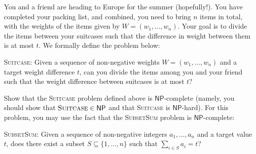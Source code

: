 \documentclass[10pt]{article}
\begin{document}
You and a friend are heading to Europe for the summer (hopefully!).  You have completed your packing list, and combined, you need to bring $n$ items in total, with the weights of the items given by $W = (w_1, \ldots, w_n)$.  Your goal is to divide the items between your suitcases such that the difference in weight between them is at most $t$. We formally define the problem below: 

\begin{framed}
  \noindent
  \textsc{Suitcase}: Given a sequence of non-negative weights $W = (w_1, \ldots, w_n)$ and a target weight difference
  $t$, can you divide the items among you and your friend such that the weight difference between suitcases is at most $t$?
\end{framed}
  
  Show that the \textsc{Suitcase} problem defined above is $\mathsf{NP}$-complete (namely, you should
  show that $\textsc{Suitcase} \in \mathsf{NP}$ and that \textsc{Suitcase} is $\mathsf{NP}$-hard). For this
  problem, you may use the fact that the \textsc{SubsetSum} problem is $\mathsf{NP}$-complete:

  \begin{minipage}[t]{\linewidth}
  \begin{framed}
    \textsc{SubsetSum}: Given a sequence of non-negative integers $a_1, \ldots, a_n$
    and a target value $t$, does there exist
    a subset $S \subseteq \{ 1, \ldots, n \}$ such that $\sum_{i \in S} a_i = t$?
  \end{framed}
  \end{minipage}
\end{document}
